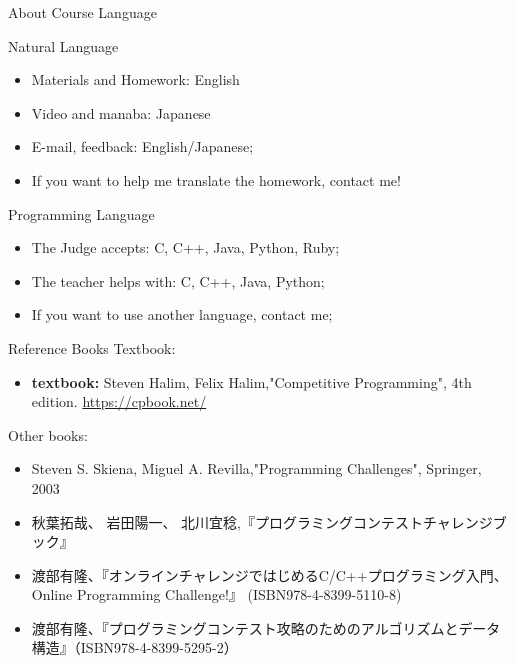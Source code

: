 \begin{frame}{About Course Language}
  \begin{block}{Natural Language}
    \begin{itemize}
      \item Materials and Homework: English
      \item Video and manaba: Japanese
      \item E-mail, feedback: English/Japanese;
      \item If you want to help me translate the homework, contact me!
    \end{itemize}
  \end{block}

  \begin{block}{Programming Language}
    \begin{itemize}
      \item The Judge accepts: C, C++, Java, Python, Ruby;
      \item The teacher helps with: C, C++, Java, Python;
      \item If you want to use another language, contact me;
    \end{itemize}
  \end{block}
\end{frame}

\begin{frame}{Reference Books}
  Textbook:
  \begin{itemize}
    \item {\bf textbook:} Steven Halim, Felix Halim,"Competitive Programming", 4th edition. \url{https://cpbook.net/}
  \end{itemize}
  \bigskip

  Other books:
  \begin{itemize}
    \item Steven S. Skiena, Miguel A. Revilla,"Programming Challenges", Springer, 2003
    \item 秋葉拓哉、 岩田陽一、 北川宜稔,『プログラミングコンテストチャレンジブック』
    \item 渡部有隆、『オンラインチャレンジではじめるC/C++プログラミング入門、Online Programming Challenge!』 (ISBN978-4-8399-5110-8)
    \item 渡部有隆、『プログラミングコンテスト攻略のためのアルゴリズムとデータ構造』（ISBN978-4-8399-5295-2）
  \end{itemize}
\end{frame}

